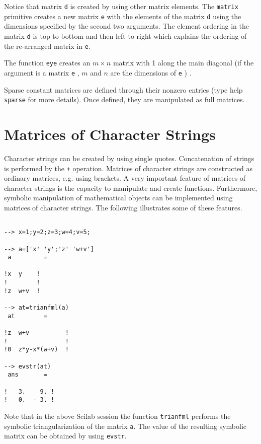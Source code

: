 Notice that matrix {\tt d} is created by using other matrix
elements.  The {\tt matrix} 
primitive creates a new matrix {\tt e} with the elements of the
matrix {\tt d} using
the dimensions specified by the second two arguments.  The element
ordering in the matrix {\tt d} is top to bottom and then left to right
which explains the ordering of the re-arranged matrix in {\tt e}.

The function {\tt eye} creates an $m\times n$ matrix with 1 along the main
diagonal (if the argument is a matrix {\tt e} , $m$ and $n$ are the 
dimensions of {\tt e} ) .

Sparse constant matrices are defined through their nonzero entries 
(type help {\tt sparse} for more details). Once defined, they are
manipulated as full matrices.


\section{Matrices of Character Strings}
\label{s2.3}

	Character strings can be created by using single quotes.
Concatenation of strings is performed by the {\tt +} operation.
Matrices of character strings are constructed as ordinary matrices,
e.g. using brackets.  A very important feature of matrices of
character strings is the capacity to manipulate and create functions.
Furthermore, symbolic manipulation of mathematical objects can be
implemented using matrices of character strings.  The following
illustrates some of these features.
\begin{verbatim}
 
--> x=1;y=2;z=3;w=4;v=5;
 
--> a=['x' 'y';'z' 'w+v']
 a         =
 
!x  y    !
!        !
!z  w+v  !
 
--> at=trianfml(a)
 at        =
 
!z  w+v          !
!                !
!0  z*y-x*(w+v)  !
 
--> evstr(at)
 ans       =
 
!   3.    9. !
!   0.  - 3. !
\end{verbatim}
Note that in the above Scilab session the function 
{\tt trianfml}
performs the symbolic triangularization of the matrix {\tt a}.
The value of the resulting symbolic matrix can be obtained by
using {\tt evstr}.  

